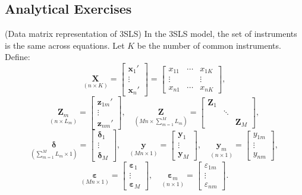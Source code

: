 
\begin{problemset}

\subsection*{Analytical Exercises}

\exercise[1]
(Data matrix representation of 3SLS)\quad
In the 3SLS model, the set of instruments is the same across equations.
Let $K$ be the number of common instruments. Define:
\[
\underset{(n \times K)}{\mathbf{X}}
= \begin{bmatrix} \mathbf{x}_1' \\ \vdots \\ \mathbf{x}_n' \end{bmatrix}
= \begin{bmatrix}
x_{11} & \cdots & x_{1K} \\
\vdots & & \vdots \\
x_{n1} & \cdots & x_{nK}
\end{bmatrix},
\]
\[
\underset{(n \times L_m)}{\mathbf{Z}_m}
= \begin{bmatrix} \mathbf{z}_{1m}' \\ \vdots \\ \mathbf{z}_{nm}' \end{bmatrix}, \quad
\underset{(Mn \times \sum_{m=1}^{M} L_m)}{\mathbf{Z}}
= \begin{bmatrix}
\mathbf{Z}_1 & & \\
& \ddots & \\
& & \mathbf{Z}_M
\end{bmatrix},
\]
\[
\underset{(\sum_{m=1}^{M} L_m \times 1)}{\boldsymbol{\delta}}
= \begin{bmatrix} \boldsymbol{\delta}_1 \\ \vdots \\ \boldsymbol{\delta}_M \end{bmatrix}, \quad
\underset{(Mn \times 1)}{\mathbf{y}}
= \begin{bmatrix} \mathbf{y}_1 \\ \vdots \\ \mathbf{y}_M \end{bmatrix}, \quad
\underset{(n \times 1)}{\mathbf{y}_m}
= \begin{bmatrix} y_{1m} \\ \vdots \\ y_{nm} \end{bmatrix},
\]
\[
\underset{(Mn \times 1)}{\boldsymbol{\varepsilon}}
= \begin{bmatrix} \boldsymbol{\varepsilon}_1 \\ \vdots \\ \boldsymbol{\varepsilon}_M \end{bmatrix}, \quad
\underset{(n \times 1)}{\boldsymbol{\varepsilon}_m}
= \begin{bmatrix} \varepsilon_{1m} \\ \vdots \\ \varepsilon_{nm} \end{bmatrix}.
\]


\end{problemset}

